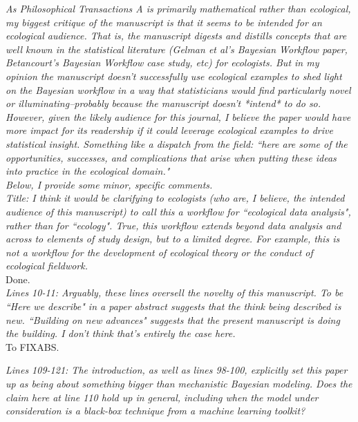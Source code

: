 \documentclass[11pt,a4paper]{article}
\begin{document}
\emph{As Philosophical Transactions A is primarily mathematical rather than ecological, my biggest critique of the manuscript is that it seems to be intended for an ecological audience. That is, the manuscript digests and distills concepts that are well known in the statistical literature (Gelman et al's Bayesian Workflow paper, Betancourt's Bayesian Workflow case study, etc) for ecologists. But in my opinion the manuscript doesn't successfully use ecological examples to shed light on the Bayesian workflow in a way that statisticians would find particularly novel or illuminating--probably because the manuscript doesn't *intend* to do so. However, given the likely audience for this journal, I believe the paper would have more impact for its readership if it could leverage ecological examples to drive statistical insight. Something like a dispatch from the field: ``here are some of the opportunities, successes, and complications that arise when putting these ideas into practice in the ecological domain."}\\

\emph{Below, I provide some minor, specific comments.}\\


\emph{Title: I think it would be clarifying to ecologists (who are, I believe, the intended audience of this manuscript) to call this a workflow for ``ecological data analysis", rather than for ``ecology". True, this workflow extends beyond data analysis and across to elements of study design, but to a limited degree. For example, this is not a workflow for the development of ecological theory or the conduct of ecological fieldwork.}\\

Done. \\


\emph{Lines 10-11: Arguably, these lines oversell the novelty of this manuscript. To be ``Here we describe" in a paper abstract suggests that the think being described is new. ``Building on new advances" suggests that the present manuscript is doing the building. I don't think that's entirely the case here.}\\

To FIXABS.


\emph{Lines 109-121: The introduction, as well as lines 98-100, explicitly set this paper up as being about something bigger than mechanistic Bayesian modeling. Does the claim here at line 110 hold up in general, including when the model under consideration is a black-box technique from a machine learning toolkit?}\\
\end{document}
